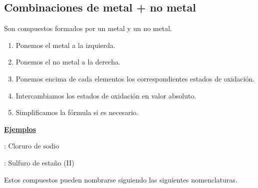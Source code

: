 \documentclass[11pt, a4paper]{article}
\begin{document}
\subsection{Combinaciones de metal + no metal}

Son compuestos formados por un metal y un no metal.

\vspace*{2mm}
\begin{enumerate}[label=\itembolascolor{\arabic*}{green!40!black}]
    \item Ponemos el metal a la izquierda.
    \item Ponemos el no metal a la derecha.
    \item Ponemos encima de cada elementos los correspondientes estados de oxidación.
    \item Intercambiamos los estados de oxidación en valor absoluto.
    \item Simplificamos la fórmula si es necesario.
\end{enumerate}

\textbf{\uline{Ejemplos}}

 : Cloruro de sodio \ch{->}   \ch{->} 

 : Sulfuro de estaño (II) \ch{->}   \ch{->}  \ch{->} 

\vspace*{2mm}

Estos compuestos pueden nombrarse siguiendo las siguientes nomenclaturas.
\end{document}
